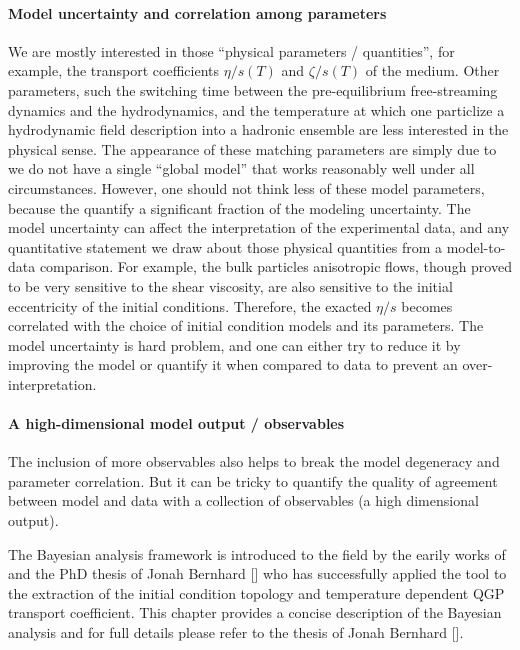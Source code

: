 \paragraph{Model uncertainty and correlation among parameters}
We are mostly interested in those ``physical parameters / quantities'', for example, the transport coefficients $\eta/s(T)$ and $\zeta/s(T)$ of the medium.
Other parameters, such the switching time between the pre-equilibrium free-streaming dynamics and the hydrodynamics, and the temperature at which one particlize a hydrodynamic field description into a hadronic ensemble are less interested in the physical sense.
The appearance of these matching parameters are simply due to we do not have a single ``global model'' that works reasonably well under all circumstances.
However, one should not think less of these model parameters, because the quantify a significant fraction of the modeling uncertainty.
The model uncertainty can affect the interpretation of the experimental data, and any quantitative statement we draw about those physical quantities from a model-to-data comparison.
For example, the  bulk particles anisotropic flows, though proved to be very sensitive to the shear viscosity, are also sensitive to the initial eccentricity of the initial conditions.
Therefore, the exacted $\eta/s$ becomes correlated with the choice of initial condition models and its parameters.
The model uncertainty is hard problem, and one can either try to reduce it by improving the model or quantify it when compared to data to prevent an over-interpretation.

\paragraph{A high-dimensional model output / observables}
The inclusion of more observables also helps to break the model degeneracy and parameter correlation.
But it can be tricky to quantify the quality of agreement between model and data with a collection of observables (a high dimensional output).


The Bayesian analysis framework is introduced to the field by the earily works of and the PhD thesis of Jonah Bernhard [] who has successfully applied the tool to the extraction of the initial condition topology and temperature dependent QGP transport coefficient.
This chapter provides a concise description of the Bayesian analysis and for full details please refer to the thesis of Jonah Bernhard [].

